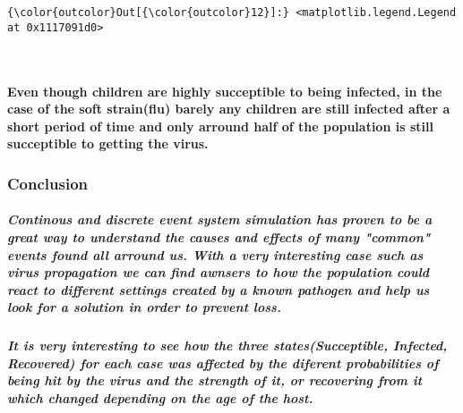 \documentclass[11pt]{article}
\begin{document}
\begin{Verbatim}[commandchars=\\\{\}]
{\color{outcolor}Out[{\color{outcolor}12}]:} <matplotlib.legend.Legend at 0x1117091d0>
\end{Verbatim}
            
    \begin{center}
    \end{center}
    { \hspace*{\fill} \\}
    
    \paragraph{Even though children are highly succeptible to being
infected, in the case of the soft strain(flu) barely any children are
still infected after a short period of time and only arround half of the
population is still succeptible to getting the
virus.}\label{even-though-children-are-highly-succeptible-to-being-infected-in-the-case-of-the-soft-strainflu-barely-any-children-are-still-infected-after-a-short-period-of-time-and-only-arround-half-of-the-population-is-still-succeptible-to-getting-the-virus.}

    \subsubsection{Conclusion}\label{conclusion}

\subparagraph{Continous and discrete event system simulation has proven
to be a great way to understand the causes and effects of many "common"
events found all arround us. With a very interesting case such as virus
propagation we can find awnsers to how the population could react to
different settings created by a known pathogen and help us look for a
solution in order to prevent
loss.}\label{continous-and-discrete-event-system-simulation-has-proven-to-be-a-great-way-to-understand-the-causes-and-effects-of-many-common-events-found-all-arround-us.-with-a-very-interesting-case-such-as-virus-propagation-we-can-find-awnsers-to-how-the-population-could-react-to-different-settings-created-by-a-known-pathogen-and-help-us-look-for-a-solution-in-order-to-prevent-loss.}

\subparagraph{It is very interesting to see how the three
states(Succeptible, Infected, Recovered) for each case was affected by
the diferent probabilities of being hit by the virus and the strength of
it, or recovering from it which changed depending on the age of the
host.}\label{it-is-very-interesting-to-see-how-the-three-statessucceptible-infected-recovered-for-each-case-was-affected-by-the-diferent-probabilities-of-being-hit-by-the-virus-and-the-strength-of-it-or-recovering-from-it-which-changed-depending-on-the-age-of-the-host.}


    
    
    
    
\end{document}
